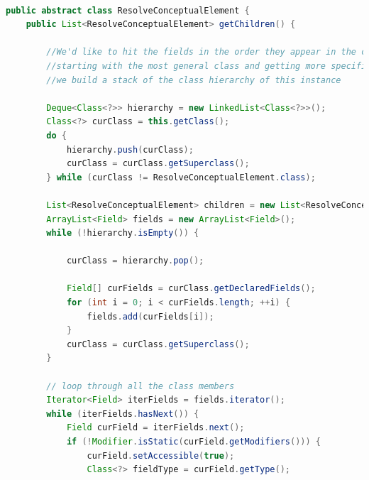 \documentclass[times]{speauth}
\begin{document}
\begin{lstlisting}[language=java,caption={ResolveConceptualElement.java}]

public abstract class ResolveConceptualElement {
    public List<ResolveConceptualElement> getChildren() {

        //We'd like to hit the fields in the order they appear in the class,
        //starting with the most general class and getting more specific.  So,
        //we build a stack of the class hierarchy of this instance

        Deque<Class<?>> hierarchy = new LinkedList<Class<?>>();
        Class<?> curClass = this.getClass();
        do {
            hierarchy.push(curClass);
            curClass = curClass.getSuperclass();
        } while (curClass != ResolveConceptualElement.class);

        List<ResolveConceptualElement> children = new List<ResolveConceptualElement>();
        ArrayList<Field> fields = new ArrayList<Field>();
        while (!hierarchy.isEmpty()) {

            curClass = hierarchy.pop();

            Field[] curFields = curClass.getDeclaredFields();
            for (int i = 0; i < curFields.length; ++i) {
                fields.add(curFields[i]);
            }
            curClass = curClass.getSuperclass();
        }

        // loop through all the class members
        Iterator<Field> iterFields = fields.iterator();
        while (iterFields.hasNext()) {
            Field curField = iterFields.next();
            if (!Modifier.isStatic(curField.getModifiers())) {
                curField.setAccessible(true);
                Class<?> fieldType = curField.getType();


\end{lstlisting}
\end{document}
